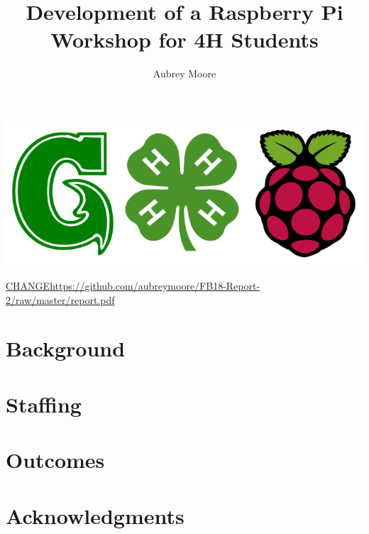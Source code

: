 \documentclass[12pt,letterpaper,english,bibliography=totocnumbered]{scrartcl}
\begin{document}
\titlehead{Report on Use of UOG-CNAS-EO Core Funds for FY2018}
\title{Development of a Raspberry Pi Workshop for 4H Students}
\author{Aubrey Moore}
\maketitle

\begin{center}
\includegraphics[width=0.7\linewidth]{UOG-4H-RPi.png}
\end{center}



\begin{center}
\url{CHANGEhttps://github.com/aubreymoore/FB18-Report-2/raw/master/report.pdf}
\end{center}

\newpage
\tableofcontents{}

\newpage
\section{Background}

\section{Staffing}

\section{Outcomes}

\cite{moore_open_2018}

\section{Acknowledgments}

\newpage
\printbibliography

\newpage
\appendix
\appendixpage
\addappheadtotoc

%
%
%
%
%
\end{document}
